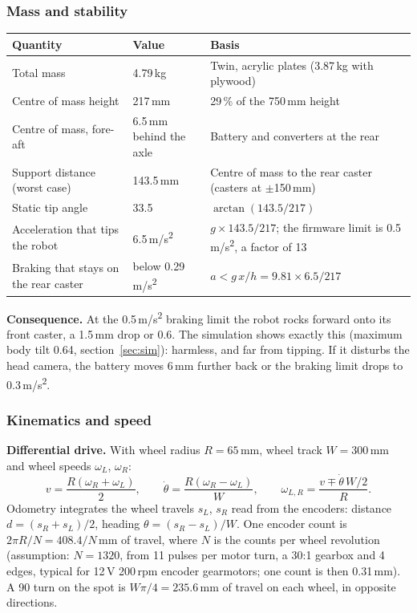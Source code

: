 \documentclass[11pt,a4paper]{article}
\renewcommand{\deg}{\textdegree}
\begin{document}
\subsubsection{Mass and stability}\label{sec:stab}
\begin{table}[H]\small
\begin{tabularx}{\linewidth}{@{}LP{30mm}L@{}}
\toprule
\textbf{Quantity} & \textbf{Value} & \textbf{Basis}\\
\midrule
Total mass & 4.79\,kg & Twin, acrylic plates (3.87\,kg with plywood)\\
Centre of mass height & 217\,mm & 29\,\% of the 750\,mm height\\
Centre of mass, fore-aft & 6.5\,mm behind the axle & Battery and converters at the rear\\
Support distance (worst case) & 143.5\,mm & Centre of mass to the rear caster (casters at $\pm$150\,mm)\\
Static tip angle & 33.5\deg & $\arctan(143.5/217)$\\
Acceleration that tips the robot & 6.5\,m/s\textsuperscript{2} & $g \times 143.5/217$; the firmware limit is 0.5\,m/s\textsuperscript{2}, a factor of 13\\
Braking that stays on the rear caster & below 0.29\,m/s\textsuperscript{2} & $a < g\,x/h = 9.81 \times 6.5/217$\\
\bottomrule
\end{tabularx}
\end{table}
\textbf{Consequence.} At the 0.5\,m/s\textsuperscript{2} braking limit the robot rocks forward onto its front caster, a 1.5\,mm drop or 0.6\deg. The simulation shows exactly this (maximum body tilt 0.64\deg, section~\ref{sec:sim}): harmless, and far from tipping. If it disturbs the head camera, the battery moves 6\,mm further back or the braking limit drops to 0.3\,m/s\textsuperscript{2}.

\subsubsection{Kinematics and speed}
\textbf{Differential drive.} With wheel radius $R = 65$\,mm, wheel track $W = 300$\,mm and wheel speeds $\omega_L$, $\omega_R$:
\[ v = \frac{R(\omega_R+\omega_L)}{2}, \qquad \dot\theta = \frac{R(\omega_R-\omega_L)}{W}, \qquad
\omega_{L,R} = \frac{v \mp \dot\theta\,W/2}{R}. \]
Odometry integrates the wheel travels $s_L$, $s_R$ read from the encoders: distance $d=(s_R+s_L)/2$, heading $\theta=(s_R-s_L)/W$. One encoder count is $2\pi R/N = 408.4/N$\,mm of travel, where $N$ is the counts per wheel revolution (assumption: $N = 1320$, from 11 pulses per motor turn, a 30:1 gearbox and 4 edges, typical for 12\,V 200\,rpm encoder gearmotors; one count is then 0.31\,mm). A 90\deg{} turn on the spot is $W\pi/4 = 235.6$\,mm of travel on each wheel, in opposite directions.
\end{document}
